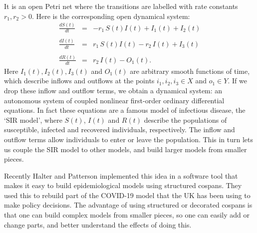 \documentclass[reqno]{amsart}
\begin{document}
It is an open Petri net where the transitions are labelled with rate constants $r_1, r_2 > 0$.
Here is the corresponding open dynamical system:
\begin{equation}
\label{eq:openPetrir}
  \begin{array}{ccl} \displaystyle{\frac{dS(t)}{dt}} &=& -r_1 \, S(t)I(t)  + I_1(t) + I_2(t) \\ \\
\displaystyle{\frac{dI(t)}{dt}}  &=& r_1\, S(t)I(t) - r_2 \, I(t) + I_3(t)  \\  \\
\displaystyle{\frac{dR(t)}{dt}}  &=&   r_2 \, I(t)  - O_1(t).
\end{array}
\end{equation}
Here $I_1(t),I_2(t),I_3(t)$ and $O_1(t)$ are arbitrary smooth functions of time, which describe inflows and outflows at the points $i_1,i_2,i_3 \in X$ and $o_1 \in Y$.
If we drop these inflow and outflow terms, we obtain a dynamical system: an autonomous system of coupled nonlinear first-order ordinary differential equations.   In fact these equations are a famous model of infectious disease, the `SIR model', where $S(t)$, $I(t)$ and $R(t)$ describe the populations of susceptible, infected and recovered individuals, respectively.   The inflow and outflow terms allow individuals to enter or leave the population.   This in turn lets us couple the SIR model to other models, and build larger models from smaller pieces.  

Recently Halter and Patterson \cite{HP} implemented this idea in a software tool that makes it easy to build epidemiological models using structured cospans.  They used this to rebuild part of the COVID-19 model that the UK has been using to make policy decisions.  The advantage of using structured or decorated cospans is that one can build complex models from smaller pieces, so one can easily add or change parts, and better understand the effects of doing this.
\end{document}
